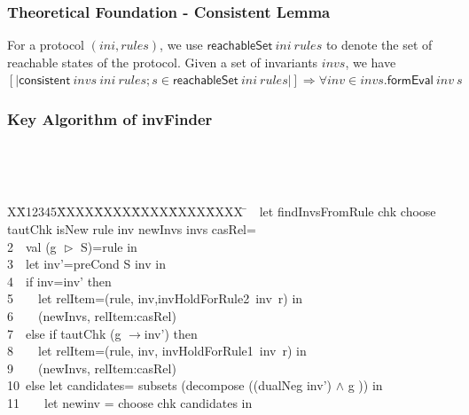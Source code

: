 \documentclass{beamer}
\newlength{\fminilength}
\newenvironment{fmini}[1][\linewidth]
  {\setlength{\fminilength}{#1\fboxsep-2\fboxrule}%
   \vspace{2ex}\noindent\begin{lrbox}{\fminibox}\begin{minipage}{\fminilength}%
   \mbox{ }\hfill\vspace{-2.5ex}}%
  {\end{minipage}\end{lrbox}\vspace{1ex}\hspace{0ex}%
   \framebox{\usebox{\fminibox}}}
\newenvironment{specification}
{\noindent\scriptsize
\tt\begin{fmini}\begin{tabbing}X\=X12345\=XXXX\=XXXX\=XXXX\=XXXX\=XXXX
\=\+\kill} {\end{tabbing}\normalfont\end{fmini}}
\def \twoSpaces {\ \ }
\def \oneSpace {\ }
\def \oneSpace {\ }
\def \andc {\wedge }
\begin{document}
\begin{frame}\frametitle{Theoretical Foundation - Consistent Lemma}

\begin{lemma}\label{consistentLemma}%
For a protocol $( ini,  rules)$,
we use $\mathsf{reachableSet}~   ini~ rules$
to denote the set of reachable states of the protocol.
Given a set of invariants $ invs$,
we have
$[| \mathsf{consistent}~  invs ~ ini~  rules;
  s \in \mathsf{reachableSet}~  ini~rules|]\Longrightarrow
  \forall  inv \in invs. \mathsf{formEval}~ inv ~s$  
\end{lemma}
\end{frame}



\begin{frame}\frametitle{Key Algorithm of {\sf invFinder}}
\begin{specification}
1\twoSpaces let findInvsFromRule  chk choose  tautChk isNew rule inv newInvs invs casRel=\\
2\twoSpaces   val (g $\vartriangleright$ S)=rule in\\

3\twoSpaces   let inv'=preCond S inv in\\


4\twoSpaces   if  inv=inv' then\\

5\twoSpaces  \twoSpaces       let relItem=(rule,
inv,invHoldForRule2~inv~r) in\\
6\twoSpaces  \twoSpaces         (newInvs, relItem:casRel)\\


7\twoSpaces   else if  tautChk (g $\longrightarrow$inv') then\\
8\twoSpaces  \twoSpaces     let relItem=(rule, inv, invHoldForRule1~inv~r) in \\
9\twoSpaces  \twoSpaces        (newInvs, relItem:casRel)   \\


10\oneSpace   else let  candidates= subsets (decompose ((dualNeg inv') $\andc$ g ))  in\\

11\twoSpaces  \twoSpaces  let newinv =  choose chk candidates in\\



\end{specification}
\end{frame}
\end{document}
